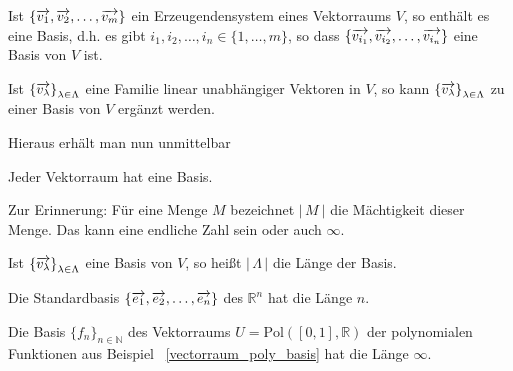 \begin{korollar} Ist $\{ \overrightarrow{v_1}, \overrightarrow{v_2}, \ldots , \overrightarrow{v_m} \}$ ein 
Erzeugendensystem eines Vektorraums $V$, so enthält es eine Basis, d.h. es gibt $i_1, i_2, \ldots, i_n \in 
\{1, \ldots , m \}$, so dass $\{ \overrightarrow{v_{i_1}}, \overrightarrow{v_{i_2}}, \ldots , 
\overrightarrow{v_{i_n}} \}$ eine Basis von $V$ ist.
\end{korollar}


\begin{korollar}\label{lin_un_basiserg} Ist $\left\{ \overrightarrow{v_{\lambda}} \right\}_{\lambda \in \Lambda}$ 
eine Familie linear unabhängiger Vektoren in $V$, so kann $\left\{ \overrightarrow{v_{\lambda}} 
\right\}_{\lambda \in \Lambda}$ zu einer Basis von $V$ ergänzt werden.
\end{korollar}


Hieraus erhält man nun unmittelbar

\begin{korollar} Jeder Vektorraum hat eine Basis.
\end{korollar}

Zur Erinnerung: Für eine Menge $M$ bezeichnet $\vert \, M \ \vert$ die Mächtigkeit dieser Menge. Das kann eine 
endliche Zahl sein oder auch $\infty$.


\begin{definition} Ist $\left\{ \overrightarrow{v_{\lambda}} \right\}_{\lambda \in \Lambda}$ eine Basis von $V$, 
so heißt $\vert \, \Lambda \, \vert$ die Länge der Basis.
\end{definition}

\begin{beispiel} Die Standardbasis $\{ \overrightarrow{e_1}, \overrightarrow{e_2}, \ldots , \overrightarrow{e_n}\}$ 
des $\mathbb R^n$ hat die Länge $n$.
\end{beispiel}

\begin{beispiel} Die Basis $\{ f_n \}_{n \in \mathbb N}$ des Vektorraums $U = \textrm{Pol}([0,1], \mathbb R)$ der 
polynomialen Funktionen aus Beispiel ~\ref{vectorraum_poly_basis} hat die Länge $\infty$.
\end{beispiel}

